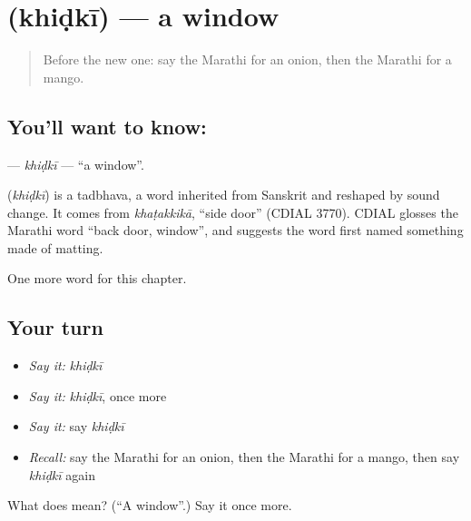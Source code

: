 \section[\texorpdfstring{\mr{खिडकी} (khiḍkī)}{खिडकी (khiḍkī)}]{ (khiḍkī) — a window}

\label{lesson:MR-C89-khidki}



\begin{quote}
Before the new one: say the Marathi for an onion, then the Marathi for a mango.
\end{quote}

\subsection*{You'll want to know: }
\textbf{} — \emph{khiḍkī} — \textquotedblleft{}a window\textquotedblright{}.

\begin{cousinweb}
\textbf{} (\emph{khiḍkī}) is a tadbhava, a word inherited from Sanskrit and reshaped by sound change. It comes from \emph{khaṭakkikā}, \textquotedblleft{}side door\textquotedblright{} (CDIAL 3770). CDIAL glosses the Marathi word \textquotedblleft{}back door, window\textquotedblright{}, and suggests the word first named something made of matting.
\end{cousinweb}

\begin{grammarlens}[title={What you've built}]
One more word for this chapter.
\end{grammarlens}

\subsection*{Your turn}
\begin{itemize}
\raggedright
  \item \emph{Say it:} \emph{khiḍkī}
  \item \emph{Say it:} \emph{khiḍkī}, once more
  \item \emph{Say it:} say \emph{khiḍkī}
  \item \emph{Recall:} say the Marathi for an onion, then the Marathi for a mango, then say \emph{khiḍkī} again
\end{itemize}

\begin{tcolorbox}[breakable,colback=teal!4,colframe=teal!35!black,title={Before you move on}]
What does  mean? (\textquotedblleft{}A window\textquotedblright{}.) Say it once more.
\end{tcolorbox}
